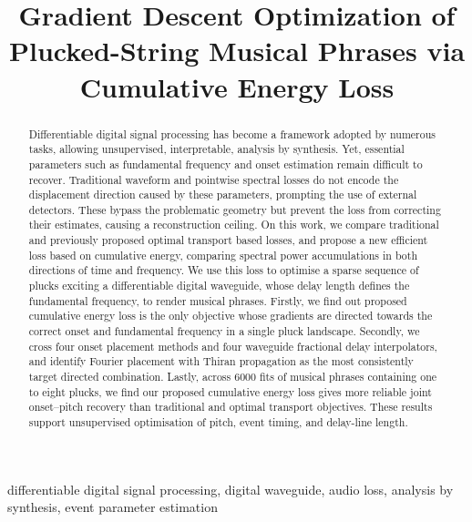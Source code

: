 \documentclass[conference]{IEEEtran}
\title{Gradient Descent Optimization of Plucked-String Musical Phrases via
Cumulative Energy Loss}
\author{\IEEEauthorblockN{Anonymous Authors}
\IEEEauthorblockA{Institution withheld for double-blind review\\
contact@example.invalid}}
\begin{document}
\maketitle

\begin{abstract}
Differentiable digital signal processing has become a framework adopted by numerous tasks, allowing unsupervised, interpretable, analysis by synthesis. Yet, essential parameters such as fundamental frequency and onset estimation remain difficult to recover. Traditional waveform and pointwise spectral losses do not encode the displacement direction caused by these parameters, prompting the use of external detectors. These bypass the problematic geometry but prevent the loss from correcting their estimates, causing a reconstruction ceiling. On this work, we compare traditional and previously proposed optimal transport based losses, and propose a new efficient loss based on cumulative energy, comparing spectral power accumulations in both directions of time and frequency. We use this loss to optimise a sparse sequence of plucks exciting a differentiable digital waveguide, whose delay length defines the fundamental frequency, to render musical phrases. Firstly, we find out proposed cumulative energy loss is the only objective whose gradients are directed towards the correct onset and fundamental frequency in a single pluck landscape. Secondly, we cross four onset placement methods and four waveguide fractional delay interpolators, and identify Fourier placement with Thiran propagation as the most consistently target directed combination. Lastly, across 6000 fits of musical phrases containing one to eight plucks, we find our proposed cumulative energy loss gives more reliable joint onset--pitch recovery than traditional and optimal transport objectives. These results support unsupervised optimisation of pitch, event timing, and delay-line length.
\end{abstract}

\begin{IEEEkeywords}
differentiable digital signal processing, digital waveguide, audio loss,
analysis by synthesis, event parameter estimation
\end{IEEEkeywords}
\end{document}
